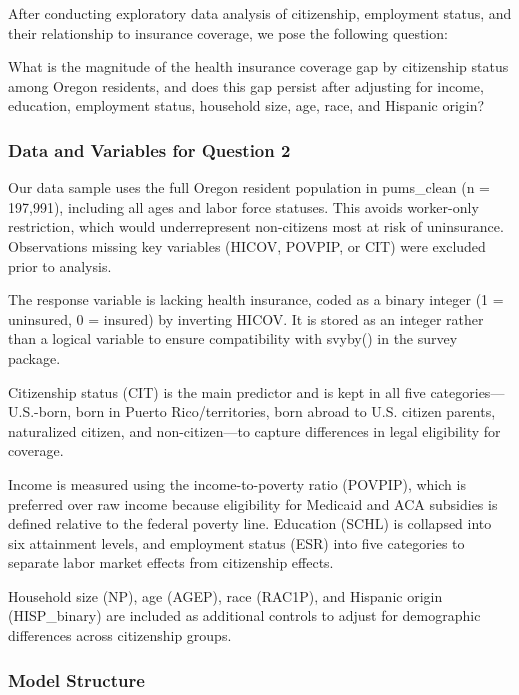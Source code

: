 \documentclass[
  letterpaper,
  DIV=11,
  numbers=noendperiod]{scrartcl}
\begin{document}
After conducting exploratory data analysis of citizenship, employment
status, and their relationship to insurance coverage, we pose the
following question:

What is the magnitude of the health insurance coverage gap by
citizenship status among Oregon residents, and does this gap persist
after adjusting for income, education, employment status, household
size, age, race, and Hispanic origin?

\subsubsection{Data and Variables for Question
2}\label{data-and-variables-for-question-2}

Our data sample uses the full Oregon resident population in pums\_clean
(n = 197,991), including all ages and labor force statuses. This avoids
worker-only restriction, which would underrepresent non-citizens most at
risk of uninsurance. Observations missing key variables (HICOV, POVPIP,
or CIT) were excluded prior to analysis.

The response variable is lacking health insurance, coded as a binary
integer (1 = uninsured, 0 = insured) by inverting HICOV. It is stored as
an integer rather than a logical variable to ensure compatibility with
svyby() in the survey package.

Citizenship status (CIT) is the main predictor and is kept in all five
categories---U.S.-born, born in Puerto Rico/territories, born abroad to
U.S. citizen parents, naturalized citizen, and non-citizen---to capture
differences in legal eligibility for coverage.

Income is measured using the income-to-poverty ratio (POVPIP), which is
preferred over raw income because eligibility for Medicaid and ACA
subsidies is defined relative to the federal poverty line. Education
(SCHL) is collapsed into six attainment levels, and employment status
(ESR) into five categories to separate labor market effects from
citizenship effects.

Household size (NP), age (AGEP), race (RAC1P), and Hispanic origin
(HISP\_binary) are included as additional controls to adjust for
demographic differences across citizenship groups.

\subsubsection{Model Structure}\label{model-structure}
\end{document}
